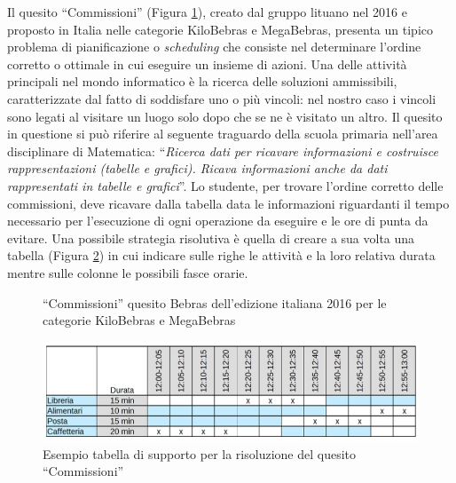 \documentclass[12pt]{report}
\begin{document}
\newpage
Il quesito ``Commissioni'' (Figura \ref{fig:corrispondenze1}), creato dal gruppo lituano nel 2016 e proposto in Italia nelle categorie KiloBebras e MegaBebras, presenta un tipico problema di pianificazione o \textit{scheduling} che consiste nel determinare l'ordine corretto o ottimale in cui eseguire un insieme di azioni. Una delle attività principali nel mondo informatico è la ricerca delle soluzioni ammissibili, caratterizzate dal fatto di soddisfare uno o più vincoli: nel nostro caso i vincoli sono legati al visitare un luogo solo dopo che se ne è visitato un altro.
Il quesito in questione si può riferire al seguente traguardo della scuola primaria nell'area disciplinare di Matematica:
``\textit{Ricerca dati per ricavare informazioni e costruisce rappresentazioni (tabelle e grafici). Ricava informazioni anche da dati rappresentati in tabelle e grafici}''.
Lo studente, per trovare l'ordine corretto delle commissioni, deve ricavare dalla tabella data le informazioni riguardanti il tempo necessario per l'esecuzione di ogni operazione da eseguire e le ore di punta da evitare. Una possibile strategia risolutiva è quella di creare a sua volta una tabella (Figura \ref{fig:corrispondenze2}) in cui indicare sulle righe le attività e la loro relativa durata mentre sulle colonne le possibili fasce orarie.


\begin{figure}[H]
	\centering
	\caption{``Commissioni'' quesito Bebras dell'edizione italiana 2016 per le categorie KiloBebras e MegaBebras}\label{fig:corrispondenze1}
\end{figure}

\begin{figure}[H]
	\centering
	\includegraphics[width=15.0cm]{./immagini/02_Cap2/corrispondenze2}
	\caption{Esempio tabella di supporto per la risoluzione del quesito ``Commissioni''}\label{fig:corrispondenze2}
\end{figure}
\end{document}
